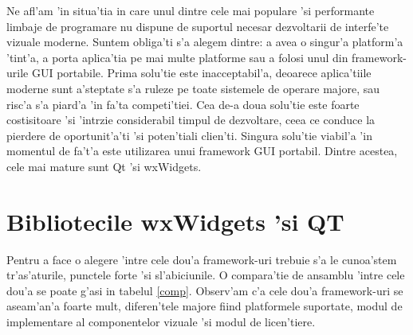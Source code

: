 \medskip

Ne afl'am 'in situa'tia in care unul dintre cele mai populare 'si performante limbaje de programare nu dispune de suportul necesar dezvoltarii de interfe'te vizuale moderne. Suntem obliga'ti s'a alegem dintre: a avea o singur'a platform'a 'tint'a, a porta aplica'tia pe mai multe platforme sau a folosi unul din framework-urile GUI portabile. Prima solu'tie este inacceptabil'a, deoarece aplica'tiile moderne sunt a'steptate s'a ruleze pe toate sistemele de operare majore, sau risc'a s'a piard'a 'in fa'ta competi'tiei. Cea de-a doua solu'tie este foarte costisitoare 'si 'int{\ia}rzie considerabil timpul de dezvoltare, ceea ce conduce la pierdere de oportunit'a'ti 'si poten'tiali clien'ti. Singura solu'tie viabil'a 'in momentul de fa't'a este utilizarea unui framework GUI portabil. Dintre acestea, cele mai mature sunt Qt 'si wxWidgets.

\section{Bibliotecile wxWidgets 'si QT}

Pentru a face o alegere 'intre cele dou'a framework-uri trebuie s'a le cunoa'stem tr'as'aturile, punctele forte 'si sl'abiciunile. O compara'tie de ansamblu 'intre cele dou'a se poate g'asi in tabelul \ref{comp}. Observ'am c'a cele dou'a framework-uri se aseam'an'a foarte mult, diferen'tele majore fiind platformele suportate, modul de implementare al componentelor vizuale 'si modul de licen'tiere.

